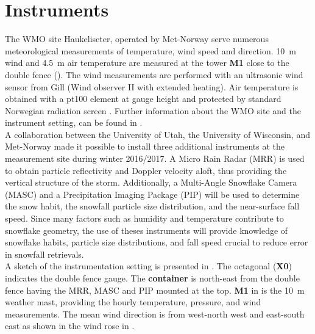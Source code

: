 \section{Instruments} \label{sec:DIM}
The WMO site Haukeliseter, operated by Met-Norway serve numerous meteorological measurements of temperature, wind speed and direction. \SI{10}{\meter} wind and \SI{4.5}{\metre} air temperature are measured at the tower \textbf{M1} close to the double fence (). The wind measurements are performed with an ultrasonic wind sensor from Gill (Wind observer II with extended heating). Air temperature is obtained with a pt100 element at gauge height and protected by standard Norwegian radiation screen \citep{wolff_derivation_2015}. %
Further information about the WMO site and the instrument setting, can be found in \citet{wolff_measurements_2013,wolff_derivation_2015}.
\\
A collaboration between the University of Utah, the University of Wisconsin, and Met-Norway made it possible to install three additional instruments at the measurement site during winter 2016/2017. A Micro Rain Radar (MRR) is used to obtain particle reflectivity and Doppler velocity aloft, thus providing the vertical structure of the storm. 
Additionally, a Multi-Angle Snowflake Camera (MASC) and a Precipitation Imaging Package (PIP) will be used to determine the snow habit, the snowfall particle size distribution, and the near-surface fall speed.  
Since many factors such as humidity and temperature contribute to snowflake geometry, the use of theses instruments will provide knowledge of snowflake habits, particle size distributions, and fall speed crucial to reduce error in snowfall retrievals.
\\
A sketch of the instrumentation setting is presented in . The octagonal (\textbf{X0}) indicates the double fence gauge. The \textbf{container} is north-east from the double fence having the MRR, MASC and PIP mounted at the top. \textbf{M1} in  is the \SI{10}{\metre} weather mast, providing the hourly \citet{eklima_norwegian_2016} temperature, pressure, and wind measurements. The mean wind direction is from west-north west and east-south east as shown in the wind rose in .


